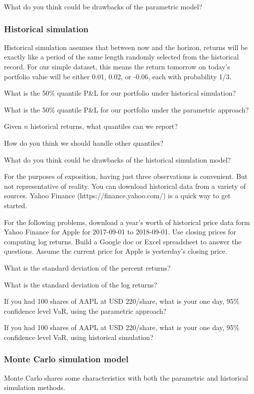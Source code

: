 \documentclass{report}
\numberwithin{problem}{chapter} %
\let\oldroblem\problem
\renewcommand{\problem}{ \oldroblem  \normalfont}
\newcommand{\vs}{\vspace}
\newcommand{\pnl}{P\&L }
\begin{document}
\problem What do you think could be drawbacks of the parametric model?

\subsubsection{Historical simulation}
Historical simulation assumes that between now and the horizon, returns will be exactly like a period of the same length randomly selected from the historical record. For our simple dataset, this means the return tomorrow on today's portfolio value will be either 0.01, 0.02, or -0.06, each with probability 1/3.

\problem What is the 50\% quantile \pnl for our portfolio under historical simulation? 

\problem What is the 50\% quantile \pnl for our portfolio under the parametric approach?

\problem Given $n$ historical returns, what quantiles can we report? 

\problem How do you think we should handle other quantiles?

\problem What do you think could be drawbacks of the historical simulation model?


\vs{1cm}
For the purposes of exposition, having just three observations is convenient. But not representative of reality. You can download historical data from a variety of sources. Yahoo Finance (https://finance.yahoo.com/) is a quick way to get started. 

For the following problems, download a year's worth of historical price data form Yahoo Finance for Apple for 2017-09-01 to 2018-09-01. Use closing prices for computing log returns.  Build a Google doc or Excel spreadsheet to answer the questions. Assume the current price for Apple is yesterday's closing price. 

\problem What is the standard deviation of the percent returns?

\problem What is the standard deviation of the log returns?

\problem If you had 100 shares of AAPL at USD 220/share, what is your one day, 95\% confidence level VaR, using the parametric approach?

\problem If you had 100 shares of AAPL at USD 220/share, what is your one day, 95\% confidence level VaR, using  historical simulation?

\subsubsection{Monte Carlo simulation model}
Monte Carlo shares some characteristics with both the parametric and historical simulation methods. 
\end{document}
